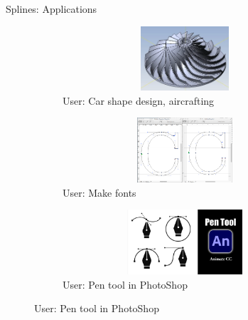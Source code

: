 \documentclass[aspectratio=169,notes]{beamer}
\begin{document}
\begin{frame}[t]{Splines: Applications}
\vspace{-0.6cm}
    \begin{figure}[H]
        \begin{subfigure}[t]{0.32\textwidth}
            \centering\includegraphics[height=2.4cm,width=1\textwidth,keepaspectratio]{lopatka.png}
            \caption*{User: Car shape design, aircrafting}
        \end{subfigure}
        \begin{subfigure}[t]{0.32\textwidth}
            \centering\includegraphics[height=2.4cm,width=1\textwidth,keepaspectratio]{font_creation.png}
            \caption*{User: Make fonts}
        \end{subfigure}
        \begin{subfigure}[t]{0.32\textwidth}
            \centering\includegraphics[height=2.4cm,width=1\textwidth,keepaspectratio]{pen_tool.jpg}
            \caption*{User: Pen tool in PhotoShop}
        \end{subfigure}


\end{figure}
\end{frame}
\end{document}

